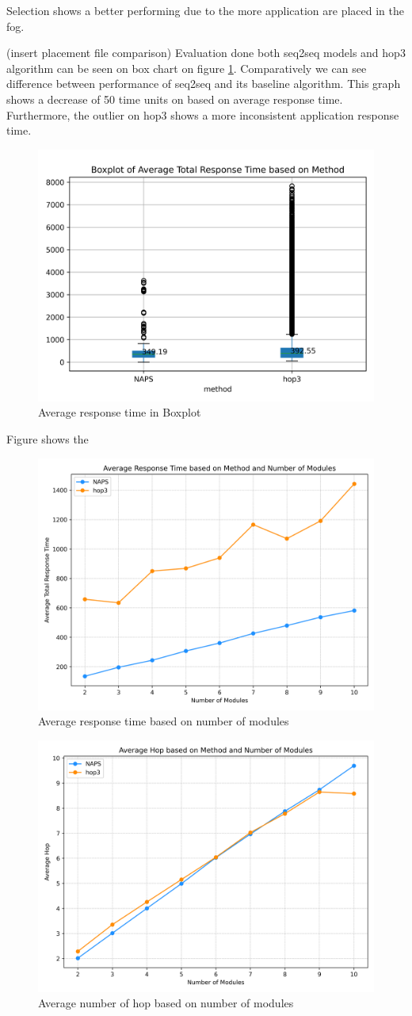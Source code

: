 \documentclass[conference]{IEEEtran}
\begin{document}
Selection shows a better performing due to the more application are placed in the fog. 

(insert placement file comparison)
Evaluation done both seq2seq models and hop3 algorithm can be seen on box chart on figure \ref{fig:Avgresponsetimebox}. Comparatively we can see difference between performance of seq2seq and its baseline algorithm. This graph shows a decrease of 50 time units on based on average response time. Furthermore, the outlier on hop3 shows a more inconsistent application response time. 



\begin{figure}[!h]
	\centering
	\includegraphics[width=.48\textwidth]{fig/test.png}
	\caption{Average response time in Boxplot}
	\label{fig:Avgresponsetimebox}
\end{figure}

Figure shows the 

\begin{figure}[!h]
	\centering
	\includegraphics[width=.48\textwidth]{fig/numberofmodulexresponsetime.png}
	\caption{Average response time based on number of modules}
	\label{fig:Avgresponsexnumba_module}
\end{figure}


\begin{figure}[!h]
	\centering
	\includegraphics[width=.48\textwidth]{fig/hopxnumberofmodule.png}
	\caption{Average number of hop based on number of modules}
	\label{fig:hopxnumbaofmodule}
\end{figure}
\end{document}

